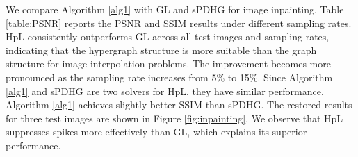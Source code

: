 \documentclass{article}
\theoremstyle{definition}
\begin{document}
We compare Algorithm \ref{alg1} with GL and sPDHG for image inpainting.
Table \ref{table:PSNR} reports the PSNR and SSIM results under different sampling rates.
HpL consistently outperforms GL across all test images and sampling rates, indicating that the hypergraph structure is more suitable than the graph structure for image interpolation problems.
The improvement becomes more pronounced as the sampling rate increases from 5\% to 15\%.
Since Algorithm \ref{alg1} and sPDHG are two solvers for HpL, they have similar performance.
Algorithm \ref{alg1} achieves slightly better SSIM than sPDHG.
The restored results for three test images are shown in Figure \ref{fig:inpainting}.
We observe that HpL suppresses spikes more effectively than GL, which explains its superior performance.
\end{document}
